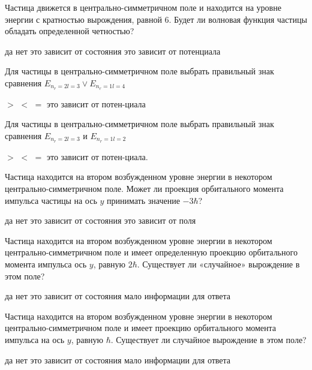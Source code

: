 \documentclass[11pt,a4paper]{exam}
\begin{document}
\begin{questions}
\question Частица движется в центрально-симметричном поле и находится на уровне энергии с кратностью вырождения, равной 6. Будет ли волновая функция частицы обладать определенной четностью?
\begin{choices}
\choice да    
\choice нет      
\choice это зависит от состояния      
\choice это зависит от потенциала
\end{choices}

\question Для частицы в центрально-симметричном поле выбрать правильный знак сравнения ${E_{{n_r} = 2l = 3}} \vee {E_{{n_r} = 1l = 4}}$ 
\begin{choices}
\choice $ > $       
\choice $ < $       
\choice $ = $       
\choice это зависит от потен-циала
\end{choices}

\question Для частицы в центрально-симметричном поле выбрать правильный знак сравнения ${E_{{n_r} = 2l = 3}}$ и ${E_{{n_r} = 1l = 2}}$
\begin{choices}
\choice $ > $       
\choice $ < $       
\choice $ = $       
\choice это зависит от потен-циала.
\end{choices}

\question Частица находится на втором возбужденном уровне энергии в некотором центрально-симметричном поле. Может ли проекция орбитального момента импульса частицы на ось $y$ принимать значение $ - 3\hbar $?
\begin{choices}
\choice да    
\choice нет      
\choice это зависит от состояния      
\choice это зависит от поля
\end{choices}

\question Частица находится на втором возбужденном уровне энергии в некотором центрально-симметричном поле и имеет определенную проекцию орбитального момента импульса ось $y$, равную $2\hbar $. Существует ли «случайное» вырождение в этом поле?
\begin{choices}
\choice да    
\choice нет      
\choice это зависит от состояния   
\choice мало информации для ответа 
\end{choices}

\question Частица находится на втором возбужденном уровне энергии в некотором центрально-симметричном поле и имеет проекцию орбитального момента импульса на ось $y$, равную $\hbar $. Существует ли случайное вырождение в этом поле?
\begin{choices}
\choice да    
\choice нет      
\choice это зависит от состояния   
\choice мало информации для ответа 
\end{choices}


\end{questions}
\end{document}
